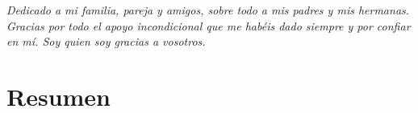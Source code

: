 \documentclass[a4paper]{report}
\begin{document}

\chapter*{}
\thispagestyle{empty}
\begin{flushright}
\textit{Dedicado a mi familia, pareja y amigos, sobre todo a mis padres y mis hermanas. Gracias por todo el apoyo incondicional que me habéis dado siempre y por confiar en mí. Soy quien soy gracias a vosotros.}
\end{flushright}

\chapter*{Resumen} %
\end{document}
